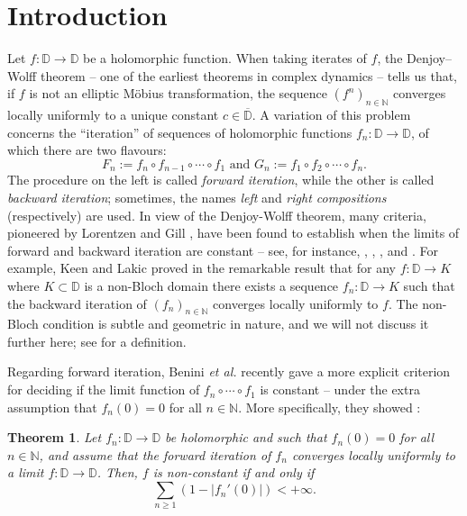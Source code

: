 \documentclass[a4paper,11pt]{article}
\theoremstyle{plain}
\newtheorem{thmout}{Theorem}
\theoremstyle{definition}
\theoremstyle{definition}
\def\D{\mathbb{D}}
\begin{document}
\section{Introduction}
Let $f:\mathbb{D}\to\mathbb{D}$ be a holomorphic function. When taking iterates of $f$, the Denjoy--Wolff theorem -- one of the earliest theorems in complex dynamics -- tells us that, if $f$ is not an elliptic M\"obius transformation, the sequence $(f^n)_{n\in\mathbb{N}}$ converges locally uniformly to a unique constant $c\in\overline{\mathbb{D}}$. A variation of this problem concerns the ``iteration'' of sequences of holomorphic functions $f_n:\mathbb{D}\to\mathbb{D}$, of which there are two flavours:
\[ \text{$F_n := f_n\circ f_{n-1}\circ\cdots\circ f_1$ and $G_n := f_1\circ f_2\circ\cdots\circ f_n$.} \]
The procedure on the left is called \textit{forward iteration}, while the other is called \textit{backward iteration}; sometimes, the names \textit{left} and \textit{right compositions} (respectively) are used. In view of the Denjoy-Wolff theorem, many criteria, pioneered by Lorentzen \cite{Lor90} and Gill \cite{Gil88}, have been found to establish when the limits of forward and backward iteration are constant -- see, for instance, \cite{BCM04}, \cite{CS21}, \cite{AC22}, and \cite[Chapters 11 to 13]{KL07}. For example, Keen and Lakic proved in \cite{KL06} the remarkable result that for any $f:\mathbb{D}\to K$ where $K\subset\D$ is a non-Bloch domain there exists a sequence $f_n:\mathbb{D}\to K$ such that the backward iteration of $(f_n)_{n\in\mathbb{N}}$ converges locally uniformly to $f$. The non-Bloch condition is subtle and geometric in nature, and we will not discuss it further here; see \cite{BCM04} for a definition.

Regarding forward iteration, Benini \textit{et al.} recently gave a more explicit criterion for deciding if the limit function of $f_n\circ \cdots\circ f_1$ is constant  -- under the extra assumption that $f_n(0) = 0$ for all $n\in\mathbb{N}$. More specifically, they showed \cite[Theorem A]{BEFRS19}:
\begin{thmout} \label{thmout:class}
Let $f_n:\D\to\D$ be holomorphic and such that $f_n(0) = 0$ for all $n\in\mathbb{N}$, and assume that the forward iteration of $f_n$ converges locally uniformly to a limit $f:\D\to\D$. Then, $f$ is non-constant if and only if
\begin{equation*}
    \sum_{n\geq 1} (1 - |f_n'(0)|) < +\infty.
\end{equation*}
\end{thmout}
\end{document}
